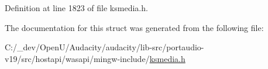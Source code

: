 Definition at line 1823 of file ksmedia.\+h.



The documentation for this struct was generated from the following file\+:\begin{DoxyCompactItemize}
\item 
C\+:/\+\_\+dev/\+Open\+U/\+Audacity/audacity/lib-\/src/portaudio-\/v19/src/hostapi/wasapi/mingw-\/include/\hyperlink{ksmedia_8h}{ksmedia.\+h}\end{DoxyCompactItemize}
